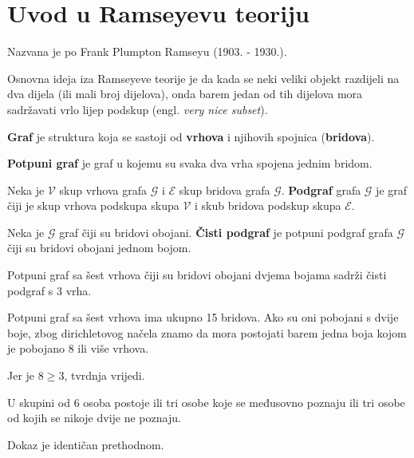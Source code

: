 \section{Uvod u Ramseyevu teoriju}

Nazvana je po Frank Plumpton Ramseyu (1903. - 1930.).

Osnovna ideja iza Ramseyeve teorije je da kada se neki veliki objekt razdijeli
na dva dijela (ili mali broj dijelova), onda barem jedan od tih dijelova mora
sadržavati vrlo lijep podskup (engl. \textit{very nice subset}).

\begin{definition}[graf]
    \textbf{Graf} je struktura koja se sastoji od \textbf{vrhova} i njihovih
    spojnica (\textbf{bridova}).
\end{definition}

\begin{definition}
    \textbf{Potpuni graf} je graf u kojemu su svaka dva vrha spojena jednim
    bridom.
\end{definition}

\begin{definition}[podgraf]
    Neka je $\mathcal{V}$ skup vrhova grafa $\mathcal{G}$ i $\mathcal{E}$ skup
    bridova grafa $\mathcal{G}$. \textbf{Podgraf} grafa $\mathcal{G}$ je graf
    čiji je skup vrhova podskupa skupa $\mathcal{V}$ i skub bridova podskup
    skupa $\mathcal{E}$.
\end{definition}

\begin{definition}
    Neka je $\mathcal{G}$ graf čiji su bridovi obojani. \textbf{Čisti podgraf}
    je potpuni podgraf grafa $\mathcal{G}$ čiji su bridovi obojani jednom bojom.
\end{definition}

\begin{example}
    Potpuni graf sa šest vrhova čiji su bridovi obojani dvjema bojama sadrži
    čisti podgraf s 3 vrha.
\end{example}

Potpuni graf sa šest vrhova ima ukupno 15 bridova. Ako su oni pobojani s dvije
boje, zbog dirichletovog načela znamo da mora postojati barem jedna boja kojom
je pobojano 8 ili više vrhova.

Jer je $8 \geq 3$, tvrdnja vrijedi.

\begin{example}
    U skupini od 6 osoba postoje ili tri osobe koje se međusovno poznaju ili tri
    osobe od kojih se nikoje dvije ne poznaju.
\end{example}

Dokaz je identičan prethodnom.
